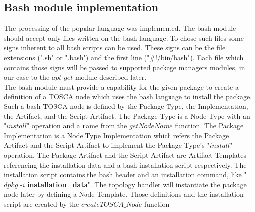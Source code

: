 \subsection*{Bash module implementation}
The processing of the popular language was implemented. 
The bash module should accept only files written on the bash language.
To chose such files some signs inherent to all bash scripts can be used. 
These signs can be the file extensions (".sh" or ".bash") and the first line ("\#!/bin/bash"). 
Each file which contains those signs will be passed to supported package managers modules, in our case to the $apt$-$get$ module described later. \\
The bash module must provide a capability for the given package to create a definition of a TOSCA node which uses the bash language to install the package.
Such a bash TOSCA node is defined by the Package Type, the  Implementation, the  Artifact, and the Script Artifact.
The Package Type is a Node Type with an "$install$" operation and a name from the $getNodeName$ function.
The Package Implementation is a Node Type Implementation which refers the Package Artifact and the Script Artifact to implement the Package Type's "$install$" operation.
The Package Artifact and the Script Artifact are Artifact Templates referencing the installation data and a bash installation script respectively.
The installation script contains the bash header and an installation command, like "$dpkg$ -$i$ \textbf{installation\_data}".
The topology handler will instantiate the package node later by defining a Node Template.
Those definitions and the installation script are created by the $createTOSCA\_Node$ function.

